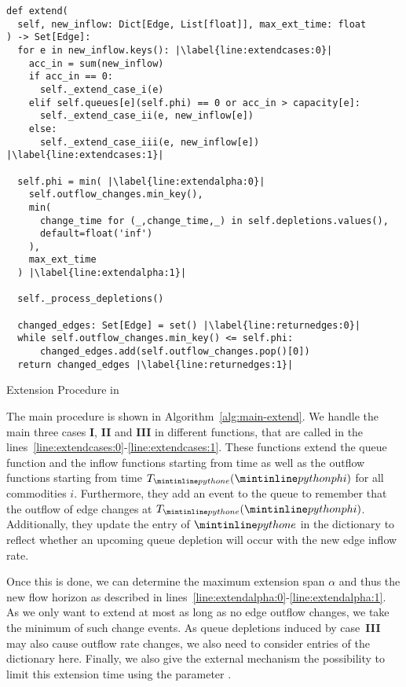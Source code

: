 \begin{algorithm}[ht]
    \begin{verbatim}
def extend(
  self, new_inflow: Dict[Edge, List[float]], max_ext_time: float
) -> Set[Edge]:
  for e in new_inflow.keys(): |\label{line:extendcases:0}|
    acc_in = sum(new_inflow)
    if acc_in == 0:
      self._extend_case_i(e)
    elif self.queues[e](self.phi) == 0 or acc_in > capacity[e]:
      self._extend_case_ii(e, new_inflow[e])
    else:
      self._extend_case_iii(e, new_inflow[e]) |\label{line:extendcases:1}|

  self.phi = min( |\label{line:extendalpha:0}|
    self.outflow_changes.min_key(),
    min(
      change_time for (_,change_time,_) in self.depletions.values(),
      default=float('inf')
    ),
    max_ext_time
  ) |\label{line:extendalpha:1}|

  self._process_depletions()
    
  changed_edges: Set[Edge] = set() |\label{line:returnedges:0}|
  while self.outflow_changes.min_key() <= self.phi:
      changed_edges.add(self.outflow_changes.pop()[0])
  return changed_edges |\label{line:returnedges:1}|

    \end{verbatim}
    \caption{Extension Procedure in }
    \label{alg:main-extend}
\end{algorithm}


The main procedure is shown in Algorithm~\ref{alg:main-extend}.
We handle the main three cases \textbf{I}, \textbf{II} and \textbf{III} in different functions, that are called in the  lines~\ref{line:extendcases:0}-\ref{line:extendcases:1}.
These functions extend the queue function  and the inflow functions  starting from time  as well as the outflow functions  starting from time $T_{\code{e}}(\code{phi})$ for all commodities $i$.
Furthermore, they add an event to the queue  to remember that the outflow of edge  changes at $T_{\code{e}}(\code{phi})$.
Additionally, they update the entry of $\code{e}$ in the dictionary  to reflect whether an upcoming queue depletion will occur with the new edge inflow rate.


Once this is done, we can determine the maximum extension span $\alpha$ and thus the new flow horizon  as described in lines~\ref{line:extendalpha:0}-\ref{line:extendalpha:1}.
As we only want to extend at most as long as no edge outflow changes, we take the minimum of such change events.
As queue depletions induced by case~\textbf{III} may also cause outflow rate changes, we also need to consider entries of the dictionary  here.
Finally, we also give the external mechanism the possibility to limit this extension time using the parameter .

